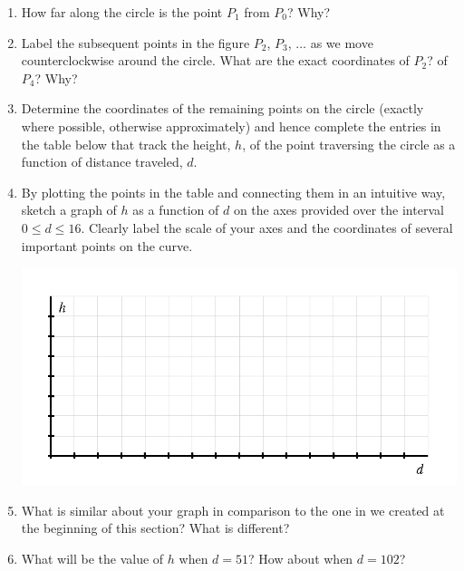 \documentclass[nooutcomes, noauthor]{ximera}
\begin{document}
\begin{exploration}
\begin{enumerate}[label=\alph*.]
\item
How far along the circle is the point \(P_1\) from \(P_0\)?  Why?%
\item
Label the subsequent points in the figure \(P_2\), \(P_3\), \(\ldots\) as we move counterclockwise around the circle.  What are the exact coordinates of \(P_2\)?  of \(P_4\)?  Why?%
\item
Determine the coordinates of the remaining points on the circle (exactly where possible, otherwise approximately) and hence complete the entries in the table below that track the height, \(h\), of the point traversing the circle as a function of distance traveled, \(d\).%
\item
By plotting the points in the table and connecting them in an intuitive way, sketch a graph of \(h\) as a function of \(d\) on the axes provided over the interval \(0 \le d \le 16\).  Clearly label the scale of your axes and the coordinates of several important points on the curve.
\begin{image}
\includegraphics{traversing-act-circular-grid.png}
\end{image}
\item
What is similar about your graph in comparison to the one in we created at the beginning of this section?  What is different?%
\item
What will be the value of \(h\) when \(d = 51\)?  How about when \(d = 102\)?%
\end{enumerate}

\end{exploration}
\end{document}

